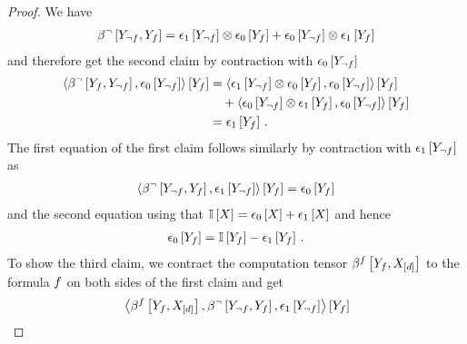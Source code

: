 \begin{proof}
    We have
    \begin{align*}
        \beta^{\lnot}\left[Y_{\lnot f},Y_{f}\right]
        = \epsilon_{1}\left[Y_{\lnot f}\right] \otimes \epsilon_{0}\left[Y_{f}\right]
        +\epsilon_{0}\left[Y_{\lnot f}\right] \otimes \epsilon_{1}\left[Y_{f}\right]
    \end{align*}
    and therefore get the second claim by contraction with $\epsilon_{0}\left[Y_{\lnot f}\right]$
    \begin{align*}
        \left\langle 
            \beta^{\lnot}\left[Y_{f},Y_{\lnot f}\right],\epsilon_{0}\left[Y_{\lnot f}\right]
        \right\rangle \left[ Y_{f} \right]
        &=  \left\langle 
            \epsilon_{1}\left[Y_{\lnot f}\right] \otimes \epsilon_{0}\left[Y_{f}\right],\epsilon_{0}\left[Y_{\lnot f}\right]
        \right\rangle \left[ Y_{f} \right] \\
        &\quad +  \left\langle 
            \epsilon_{0}\left[Y_{\lnot f}\right] \otimes \epsilon_{1}\left[Y_{f}\right],\epsilon_{0}\left[Y_{\lnot f}\right]
        \right\rangle \left[ Y_{f} \right]
        \\
        &= \epsilon_{1}\left[Y_{f}\right] \, .
    \end{align*}
    The first equation of the first claim follows similarly by contraction with $\epsilon_{1}\left[Y_{\lnot f}\right]$ as
    \begin{align*}
        \left\langle 
            \beta^{\lnot}\left[Y_{\lnot f},Y_{f}\right],\epsilon_{1}\left[Y_{\lnot f}\right]
        \right\rangle \left[ Y_{f} \right]
        = \epsilon_{0}\left[Y_{f}\right]
    \end{align*}
    and the second equation using that $\mathbb{I}\left[X\right]=\epsilon_{0}\left[X\right]+\epsilon_{1}\left[X\right]$ and hence
    \begin{align*}
        \epsilon_{0}\left[Y_{f}\right] =  \mathbb{I}\left[Y_{f}\right] - \epsilon_{1}\left[Y_{f}\right] \, .
    \end{align*}
    To show the third claim, we contract the computation tensor $\beta^{f}\left[Y_{f},X_{[d]}\right]$ to the formula $f$ on both sides of the first claim and get
    \begin{align*}
        &\contractionof{
            \bencodingofat{\exformula}{\formulavar,\shortcatvariables},\bencodingofat{\lnot}{\headvariableof{\lnot\exformula},\formulavar},\tbasisat{\headvariableof{\lnot\exformula}}
        }{\formulavar} \\

\end{align*}
\end{proof}
